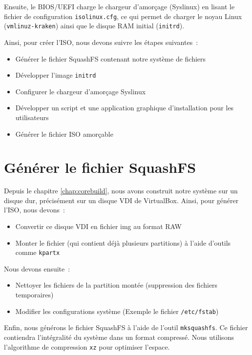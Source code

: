 Ensuite, le BIOS/UEFI charge le chargeur d’amorçage (Syslinux) en lisant le fichier de configuration \texttt{isolinux.cfg}, ce qui permet de charger le noyau Linux (\texttt{vmlinuz-kraken}) ainsi que le disque RAM initial (\texttt{initrd}).

Ainsi, pour créer l'ISO, nous devons suivre les étapes suivantes~:
\begin{itemize}
    \item Générer le fichier SquashFS contenant notre système de fichiers
    \item Développer l'image \texttt{initrd}
    \item Configurer le chargeur d'amorçage Syslinux
    \item Développer un script et une application graphique d'installation pour les utilisateurs
    \item Générer le fichier ISO amorçable
\end{itemize}


\section{Générer le fichier SquashFS}

Depuis le chapitre \ref{chap:corebuild}, nous avons construit notre système sur un disque dur, précisément sur un disque VDI de VirtualBox. Ainsi, pour générer l'ISO, nous devons~:
\begin{itemize}
    \item Convertir ce disque VDI en fichier img au format RAW
    \item Monter le fichier (qui contient déjà plusieurs partitions) à l'aide d'outils comme \texttt{kpartx}
    
\end{itemize}

Nous devons ensuite~:
\begin{itemize}
    \item Nettoyer les fichiers de la partition montée (suppression des fichiers temporaires)
    \item Modifier les configurations système (Exemple  le fichier \texttt{/etc/fstab})
    
\end{itemize}

Enfin, nous générons le fichier SquashFS à l'aide de l'outil \texttt{mksquashfs}. Ce fichier contiendra l'intégralité du système dans un format compressé. Nous utilisons l'algorithme de compression \texttt{xz} pour optimiser l'espace.

